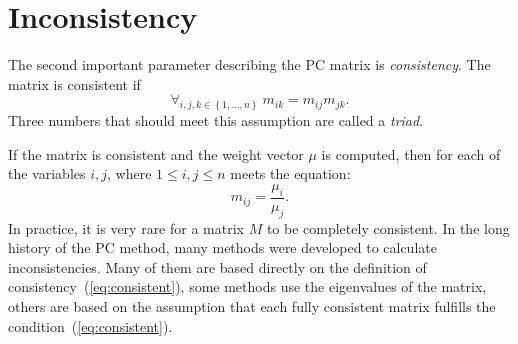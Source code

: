 \section{Inconsistency}
\label{subsec:inconsistency}
The second important parameter describing the PC matrix is \textit{consistency}. The matrix is consistent if 
	\begin{equation}
		\label{eq:consistent}
		\forall _{i,j,k \in\left\{ 1,\ldots,n\right\}}~  m_{ik}=m_{ij}m_{jk}.
	\end{equation}
Three numbers that should meet this assumption are called a \textit{triad}.

If the matrix is consistent and the weight vector $\mu$ is computed, then for each of the variables $i,j$, where $1\leq i,j\leq n$ meets the equation: 
	\begin{equation} 
		\label{eq:consistent2}		
		m_{ij}=\frac{\mu_{i}}{\mu_{j}}.
 	\end{equation}
In practice, it is very rare for a matrix $M$ to be completely consistent. In the long history of the PC method, many methods were developed to calculate inconsistencies. Many of them are based directly on the definition of consistency~(\ref{eq:consistent}), some methods use the eigenvalues of the matrix, others are based on the assumption that each fully consistent matrix fulfills the condition~(\ref{eq:consistent}).
